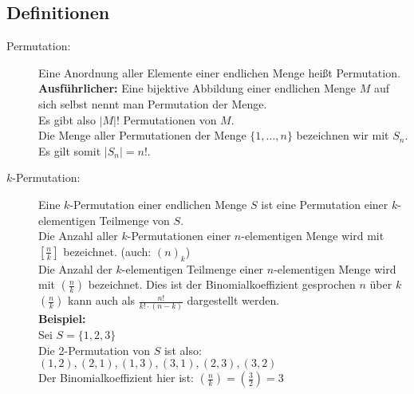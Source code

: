 \subsection*{Definitionen}
\begin{description}
  \item [Permutation:]
    Eine Anordnung aller Elemente einer endlichen Menge heißt Permutation.\\
    \textbf{Ausführlicher:} Eine bijektive Abbildung einer endlichen Menge $M$ 
    auf sich selbst nennt man Permutation der Menge.\\
    Es gibt also $|M|!$ Permutationen von $M$.\\
    Die Menge aller Permutationen der Menge $\{1,\dots,n\}$ bezeichnen wir mit 
    $S_n$. Es gilt somit $|S_n| = n!$.

  \item [$k$-Permutation:]
    Eine $k$-Permutation einer endlichen Menge $S$ ist eine Permutation einer 
    $k$-elementigen Teilmenge von $S$.\\
    Die Anzahl aller $k$-Permutationen einer $n$-elementigen Menge wird mit 
    $[\frac{n}{k}]$ bezeichnet. (auch: $(n)_k$)\\
    Die Anzahl der $k$-elementigen Teilmenge einer $n$-elementigen Menge wird
    mit $(\frac{n}{k})$ bezeichnet. Dies ist der Binomialkoeffizient gesprochen
    \glqq{}$n$ über $k$\grqq{}\\
    $(\frac{n}{k})$ kann auch als $\frac{n!}{k! \cdot (n - k)}$ dargestellt 
    werden.\\
    \textbf{Beispiel:}\\
    Sei $S = \{1,2,3\}$ \\
    Die 2-Permutation von $S$ ist also:\\
    $(1,2), (2,1), (1,3), (3,1), (2,3), (3,2)$\\
    Der Binomialkoeffizient hier ist: $(\frac{n}{k}) = (\frac{3}{2}) = 3$


\end{description}
